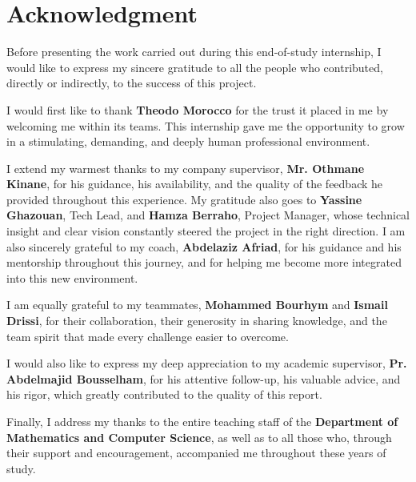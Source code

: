 \chapter*{Acknowledgment}

\vspace{0.5cm}

Before presenting the work carried out during this end-of-study internship, I would like to express my sincere gratitude to all the people who contributed, directly or indirectly, to the success of this project.

\vspace{0.3cm}

I would first like to thank \textbf{Theodo Morocco} for the trust it placed in me by welcoming me within its teams. This internship gave me the opportunity to grow in a stimulating, demanding, and deeply human professional environment.

\vspace{0.3cm}

I extend my warmest thanks to my company supervisor, \textbf{Mr. Othmane Kinane}, for his guidance, his availability, and the quality of the feedback he provided throughout this experience. My gratitude also goes to \textbf{Yassine Ghazouan}, Tech Lead, and \textbf{Hamza Berraho}, Project Manager, whose technical insight and clear vision constantly steered the project in the right direction. I am also sincerely grateful to my coach, \textbf{Abdelaziz Afriad}, for his guidance and his mentorship throughout this journey, and for helping me become more integrated into this new environment.

\vspace{0.3cm}

I am equally grateful to my teammates, \textbf{Mohammed Bourhym} and \textbf{Ismail Drissi}, for their collaboration, their generosity in sharing knowledge, and the team spirit that made every challenge easier to overcome.

\vspace{0.3cm}

I would also like to express my deep appreciation to my academic supervisor, \textbf{Pr. Abdelmajid Bousselham}, for his attentive follow-up, his valuable advice, and his rigor, which greatly contributed to the quality of this report.

\vspace{0.3cm}

Finally, I address my thanks to the entire teaching staff of the \textbf{Department of Mathematics and Computer Science}, as well as to all those who, through their support and encouragement, accompanied me throughout these years of study.

\clearpage
